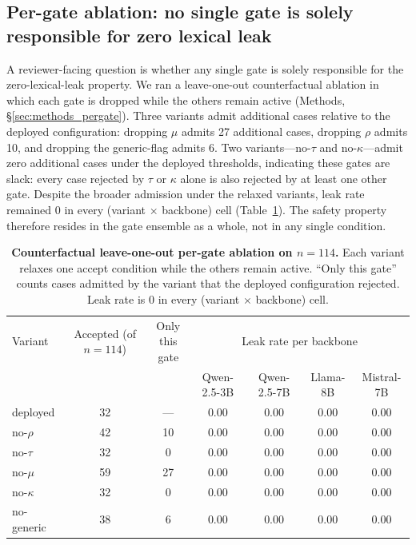 \documentclass[11pt]{article}
\begin{document}
\subsection{Per-gate ablation: no single gate is solely responsible for zero lexical leak}
\label{sec:results_pergate}

A reviewer-facing question is whether any single gate is solely responsible for the zero-lexical-leak property. We ran a leave-one-out counterfactual ablation in which each gate is dropped while the others remain active (Methods, \S\ref{sec:methods_pergate}). Three variants admit additional cases relative to the deployed configuration: dropping $\mu$ admits 27 additional cases, dropping $\rho$ admits 10, and dropping the generic-flag admits 6. Two variants---no-$\tau$ and no-$\kappa$---admit zero additional cases under the deployed thresholds, indicating these gates are slack: every case rejected by $\tau$ or $\kappa$ alone is also rejected by at least one other gate. Despite the broader admission under the relaxed variants, leak rate remained $0$ in every (variant $\times$ backbone) cell (Table~\ref{tab:per_gate}). The safety property therefore resides in the gate ensemble as a whole, not in any single condition.

\begin{table}[!htbp]
\centering
\caption{\textbf{Counterfactual leave-one-out per-gate ablation on $n=114$.} Each variant relaxes one accept condition while the others remain active. ``Only this gate'' counts cases admitted by the variant that the deployed configuration rejected. Leak rate is $0$ in every (variant $\times$ backbone) cell.}
\label{tab:per_gate}
\small
\setlength{\tabcolsep}{4pt}
\begin{tabular}{l c c | c c c c}
\toprule
Variant & \makecell[c]{Accepted\\(of $n{=}114$)} & \makecell[c]{Only\\this gate} & \multicolumn{4}{c}{Leak rate per backbone} \\
& & & Qwen-2.5-3B & Qwen-2.5-7B & Llama-8B & Mistral-7B \\
\midrule
deployed             & 32 & --- & 0.00 & 0.00 & 0.00 & 0.00 \\
no-$\rho$            & 42 & 10 & 0.00 & 0.00 & 0.00 & 0.00 \\
no-$\tau$            & 32 & 0  & 0.00 & 0.00 & 0.00 & 0.00 \\
no-$\mu$             & 59 & 27 & 0.00 & 0.00 & 0.00 & 0.00 \\
no-$\kappa$          & 32 & 0  & 0.00 & 0.00 & 0.00 & 0.00 \\
no-generic           & 38 & 6  & 0.00 & 0.00 & 0.00 & 0.00 \\
\bottomrule
\end{tabular}
\end{table}
\end{document}
